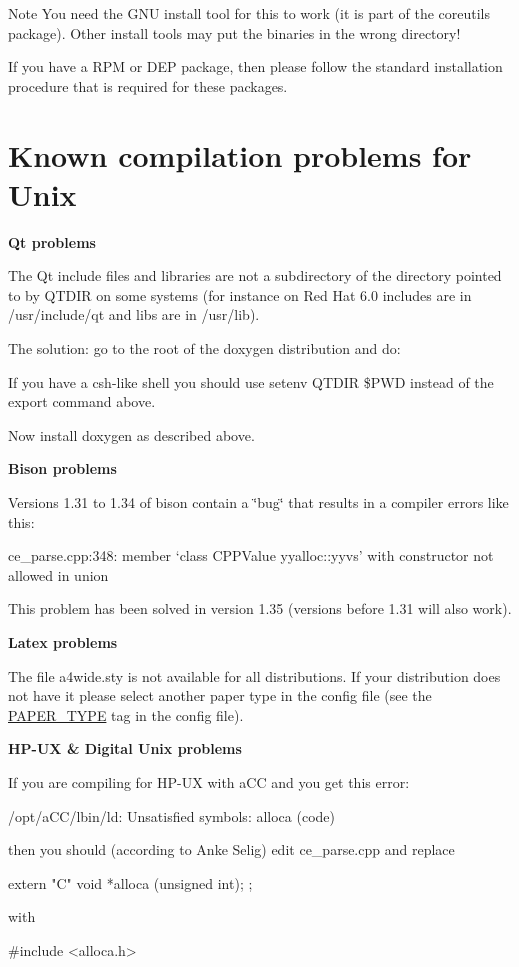 \begin{DoxyNote}{Note}
You need the GNU install tool for this to work (it is part of the coreutils package). Other install tools may put the binaries in the wrong directory!
\end{DoxyNote}
If you have a RPM or DEP package, then please follow the standard installation procedure that is required for these packages.\hypertarget{install_unix_problems}{}\section{Known compilation problems for Unix}\label{install_unix_problems}
{\bfseries Qt problems}

The Qt include files and libraries are not a subdirectory of the directory pointed to by QTDIR on some systems (for instance on Red Hat 6.0 includes are in /usr/include/qt and libs are in /usr/lib).

The solution: go to the root of the doxygen distribution and do: 


If you have a csh-\/like shell you should use {\ttfamily setenv QTDIR \$PWD} instead of the {\ttfamily export} command above.

Now install doxygen as described above.

{\bfseries Bison problems}

Versions 1.31 to 1.34 of bison contain a \char`\"{}bug\char`\"{} that results in a compiler errors like this:

ce\_\-parse.cpp:348: member `class CPPValue yyalloc::yyvs' with constructor not allowed in union

This problem has been solved in version 1.35 (versions before 1.31 will also work).

{\bfseries Latex problems}

The file {\ttfamily a4wide.sty} is not available for all distributions. If your distribution does not have it please select another paper type in the config file (see the \hyperlink{config_cfg_paper_type}{PAPER\_\-TYPE} tag in the config file).

{\bfseries HP-\/UX \& Digital Unix problems}

If you are compiling for HP-\/UX with aCC and you get this error: \begin{DoxyVerb}
    /opt/aCC/lbin/ld: Unsatisfied symbols:
    alloca (code)
\end{DoxyVerb}
 then you should (according to Anke Selig) edit {\ttfamily ce\_\-parse.cpp} and replace \begin{DoxyVerb}
    extern "C" {
      void *alloca (unsigned int);
    };
\end{DoxyVerb}
 with \begin{DoxyVerb}
    #include <alloca.h>  
\end{DoxyVerb}


